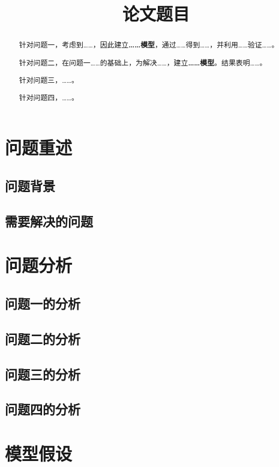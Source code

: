 \documentclass[withoutpreface]{cumcmthesis}
\title{论文题目}
\begin{document}
\maketitle

\begin{abstract}

针对问题一，考虑到……，因此建立\textbf{……模型}，通过……得到……，并利用……验证……。

针对问题二，在问题一……的基础上，为解决……，建立\textbf{……模型}。结果表明……。

针对问题三，……。

针对问题四，……。

\end{abstract}

\section{问题重述}
\subsection{问题背景}
\subsection{需要解决的问题}

\section{问题分析}
\subsection{问题一的分析}
\subsection{问题二的分析}
\subsection{问题三的分析}
\subsection{问题四的分析}


\section{模型假设}
\end{document}
